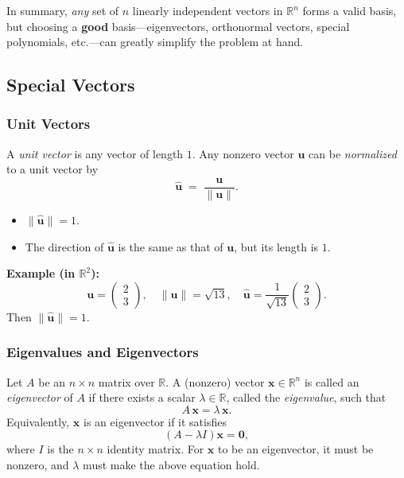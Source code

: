 \noindent
In summary, \emph{any} set of $n$ linearly independent vectors in $\mathbb{R}^n$ 
forms a valid basis, but choosing a \textbf{good} basis—eigenvectors, orthonormal vectors, 
special polynomials, etc.—can greatly simplify the problem at hand.



\subsection{Special Vectors}
\subsubsection{Unit Vectors}
A \emph{unit vector} is any vector of length $1$. Any nonzero vector $\mathbf{u}$ 
can be \emph{normalized} to a unit vector by
\[
\widehat{\mathbf{u}} \;=\; \frac{\mathbf{u}}{\|\mathbf{u}\|}.
\]
\begin{itemize}
\item $\|\widehat{\mathbf{u}}\| = 1$.
\item The direction of $\widehat{\mathbf{u}}$ is the same as that of $\mathbf{u}$, but its length is $1$.
\end{itemize}

\noindent
\textbf{Example (in $\mathbb{R}^2$):}
\[
\mathbf{u} 
= \begin{pmatrix} 2 \\ 3 \end{pmatrix},
\quad
\|\mathbf{u}\| = \sqrt{13},
\quad
\widehat{\mathbf{u}}
= \frac{1}{\sqrt{13}}
  \begin{pmatrix} 2 \\ 3 \end{pmatrix}.
\]
Then $\|\widehat{\mathbf{u}}\| = 1$.




\subsubsection{Eigenvalues and Eigenvectors}

\noindent
Let $A$ be an $n \times n$ matrix over $\mathbb{R}$. A (nonzero) vector $\mathbf{x} \in \mathbb{R}^n$ 
is called an \emph{eigenvector} of $A$ if there exists a scalar $\lambda \in \mathbb{R}$, 
called the \emph{eigenvalue}, such that
\[
  A\,\mathbf{x} = \lambda\,\mathbf{x}.
\]
Equivalently, $\mathbf{x}$ is an eigenvector if it satisfies
\[
  (A - \lambda I)\mathbf{x} = \mathbf{0},
\]
where $I$ is the $n \times n$ identity matrix. For $\mathbf{x}$ to be an eigenvector, 
it must be nonzero, and $\lambda$ must make the above equation hold.

